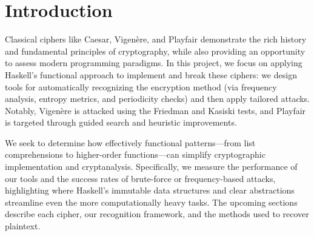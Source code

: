 
\section{Introduction}


Classical ciphers like Caesar, Vigen\`ere, and Playfair demonstrate the rich history and fundamental principles of cryptography\cite{banoth2023}, while also providing an opportunity to assess modern programming paradigms. In this project, we focus on applying Haskell’s functional approach to implement and break these ciphers: we design tools for automatically recognizing the encryption method (via frequency analysis, entropy metrics, and periodicity checks) and then apply tailored attacks. Notably, Vigen\`ere is attacked using the Friedman and Kasiski tests, and Playfair is targeted through guided search and heuristic improvements.

We seek to determine how effectively functional patterns—from list comprehensions to higher-order functions—can simplify cryptographic implementation and cryptanalysis. Specifically, we measure the performance of our tools and the success rates of brute-force or frequency-based attacks, highlighting where Haskell’s immutable data structures and clear abstractions streamline even the more computationally heavy tasks. The upcoming sections describe each cipher, our recognition framework, and the methods used to recover plaintext.
